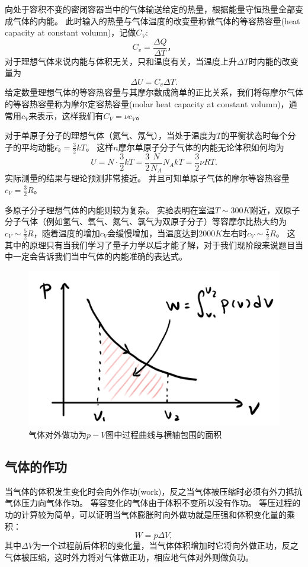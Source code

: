 向处于容积不变的密闭容器当中的气体输送给定的热量，根据能量守恒热量全部变成气体的内能。
此时输入的热量与气体温度的改变量称做气体的{\heiti 等容热容量}(heat capacity at constant volumn)，记做$C_V$:
\begin{equation}
C_v = \frac{\Delta Q}{\Delta T}，
\end{equation}
对于理想气体来说内能与体积无关，只和温度有关，当温度上升$\Delta T$时内能的改变量为
\begin{equation}
\Delta U = C_v\Delta T.
\end{equation}
给定数量理想气体的等容热容量与其摩尔数成简单的正比关系，我们将每摩尔气体的等容热容量称为{\heiti 摩尔定容热容量}(molar heat capacity at constant volumn)，通常用$c_V$来表示，这样我们有$C_V = \nu c_V$。

对于单原子分子的理想气体（氦气、氖气），当处于温度为$T$的平衡状态时每个分子的平均动能$\overline{\epsilon_k}=\frac{3}{2}kT$。
这样$n$摩尔单原子分子气体的内能无论体积如何均为
\begin{equation}
U = N\cdot \frac{3}{2}kT = \frac{3}{2}\frac{N}{N_A}N_AkT = \frac{3}{2}\nu RT.
\end{equation}
实际测量的结果与理论预测非常接近。
并且可知单原子气体的摩尔等容热容量$c_V = \frac{3}{2}R$。

多原子分子理想气体的内能则较为复杂。
实验表明在室温$T\sim 300\unit{K}$附近，双原子分子气体（例如氢气、氧气、氮气、氯气为双原子分子）等容摩尔比热大约为$c_V\sim\frac{5}{2}R$，随着温度的增加$c_V$会缓慢增加，当温度达到$2000\unit{K}$左右时$c_V\sim\frac{7}{2}R$。
这其中的原理只有当我们学习了量子力学以后才能了解，对于我们现阶段来说题目当中一定会告诉我们当中气体的内能准确的表达式。


\begin{figure}[h]
	\centering
	\includegraphics[width=0.5\linewidth]{images/before-th-1}
	\caption{气体对外做功为$p-V$图中过程曲线与横轴包围的面积}
	\label{fig:before-th-1}
\end{figure}


\subsection{气体的作功}
当气体的体积发生变化时会向外作{\heiti 功}(work)，反之当气体被压缩时必须有外力抵抗气体压力向气体作功。
等容变化的气体由于体积不变所以没有作功。
等压过程的功的计算较为简单，可以证明当气体膨胀时向外做功就是压强和体积变化量的乘积：
\begin{equation}
W=p\Delta V,
\end{equation}
其中$\Delta V$为一个过程前后体积的变化量，当气体体积增加时它将向外做正功，反之气体被压缩，这时外力将对气体做正功，相应地气体对外则做负功。



